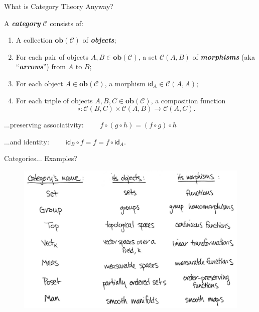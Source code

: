 \documentclass[10pt]{beamer}
\newcommand\newterm[2][]{\textbf{\itshape\color{blue!50!black}#2}}
\newcommand{\cat}[1]{\mathcal{#1}}      %
\newcommand{\ob}[1]{\mathbf{ob}(#1)}       %
\newcommand\id{\mathsf{id}}
\DeclareRobustCommand{\step}{\bigskip\noindent}
\begin{document}
\begin{frame}[fragile]{What is Category Theory Anyway?}
  \begin{definition}

    \step
    A \newterm{category} $\cat{C}$ consists of:
    \begin{enumerate}
      \item A collection $\ob{\cat{C}}$ of \newterm{objects};
      \item For each pair of objects $A, B \in \ob{\cat{C}}$,
        a set $\cat{C}(A,B)$ of \newterm{morphisms} (aka ``\newterm{arrows}'') from $A$ to $B$;
      \item For each object $A \in \ob{\cat{C}}$, a morphism $\id_A \in \cat{C}(A,A)$;
      \item For each triple of objects $A, B, C \in \ob{\cat{C}}$,
        a composition function
        \[
          \circ : \cat{C}(B,C) \times \cat{C}(A,B) \to \cat{C}(A,C).
        \]
    \end{enumerate}
    \step
    ...preserving associativity: $\qquad f \circ (g \circ h) = (f \circ g) \circ h$

    ...and identity: $\qquad \id_B \circ f = f = f \circ \id_A$.
  \end{definition}

\end{frame}

\begin{frame}[fragile]{Categories... Examples?}

  \begin{figure}[H]
    \centering
    \includegraphics[width=\textwidth]{res/category-examples.jpeg}
  \end{figure}

\end{frame}
\end{document}
